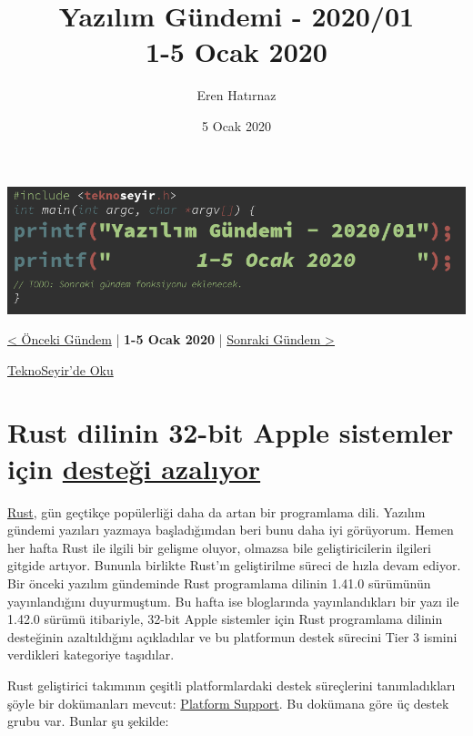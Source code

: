 \documentclass[11pt]{article}
\author{Eren Hatırnaz}
\date{5 Ocak 2020}
\title{Yazılım Gündemi - 2020/01\\\medskip
\large 1-5 Ocak 2020}
\begin{document}
\maketitle
\tableofcontents \clearpage\shorthandoff{=}

\begin{center}
\includegraphics[width=.9\linewidth]{gorseller/yazilim-gundemi-banner.png}
\end{center}
\begin{center}
\href{../../2019/23/yazilim-gundemi-23.pdf}{< Önceki Gündem} | \textbf{1-5 Ocak 2020} | \href{../02/yazilim-gundemi-2020-02.pdf}{Sonraki Gündem >}

\href{https://teknoseyir.com/blog/yazilim-gundemi-2020-01}{TeknoSeyir'de Oku}
\end{center}

\section{Rust dilinin 32-bit Apple sistemler için \href{https://blog.rust-lang.org/2020/01/03/reducing-support-for-32-bit-apple-targets.html}{desteği azalıyor}}
\label{sec:org9d79a23}
\href{https://www.rust-lang.org/}{Rust}, gün geçtikçe popülerliği daha da artan bir programlama dili. Yazılım
gündemi yazıları yazmaya başladığımdan beri bunu daha iyi görüyorum. Hemen her
hafta Rust ile ilgili bir gelişme oluyor, olmazsa bile geliştiricilerin
ilgileri gitgide artıyor. Bununla birlikte Rust'ın geliştirilme süreci de hızla
devam ediyor. Bir önceki yazılım gündeminde Rust programlama dilinin 1.41.0
sürümünün yayınlandığını duyurmuştum. Bu hafta ise bloglarında yayınlandıkları
bir yazı ile 1.42.0 sürümü itibariyle, 32-bit Apple sistemler için Rust
programlama dilinin desteğinin azaltıldığını açıkladılar ve bu platformun
destek sürecini Tier 3 ismini verdikleri kategoriye taşıdılar.

Rust geliştirici takımının çeşitli platformlardaki destek süreçlerini
tanımladıkları şöyle bir dokümanları mevcut: \href{https://forge.rust-lang.org/release/platform-support.html}{Platform Support}. Bu dokümana göre
üç destek grubu var. Bunlar şu şekilde:
\end{document}
